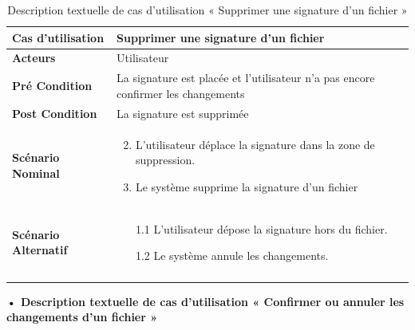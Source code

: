 \begin{longtable}{|p{5cm}|p{10cm}|}
\hline
\textbf{Cas d'utilisation}&Supprimer une signature d'un fichier \\
\hline
\textbf{Acteurs}&Utilisateur\\
\hline
\textbf{Pré Condition}&La signature est placée et l'utilisateur n'a pas encore confirmer les changements\\
\hline
\textbf{Post Condition}&La signature est supprimée\\
\hline
\textbf{Scénario Nominal}&
\vspace{-\baselineskip}
\begin{enumerate}
    \setcounter{enumi}{1}
    \item L'utilisateur déplace la signature dans la zone de suppression.
    \item Le système supprime la signature d'un fichier
\end{enumerate}\\
\hline
\textbf{Scénario Alternatif}&
\vspace{-\baselineskip}
\begin{enumerate}
    \item [1.1]L'utilisateur dépose la signature hors du fichier.
    \item [1.2]Le système annule les changements.
\end{enumerate}\\
\hline
\caption{Description textuelle de cas d'utilisation « Supprimer une signature d'un fichier  »}
\label{tab:description-textuelle-de-cas-d-utilisation-supprimer-une-signature-d-un-fichier}
\end{longtable}


\textbf{•	Description textuelle de cas d'utilisation « Confirmer ou annuler les changements d'un fichier »}

